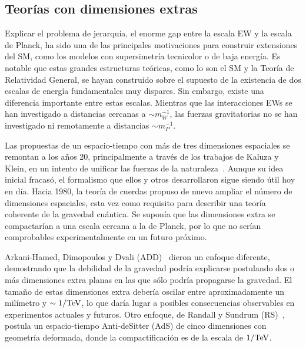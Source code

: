 \subsection{Teor\'ias con dimensiones extras}
\label{subsec:theory:bsm:qbh}

Explicar el problema de jerarqu\'ia, el enorme gap entre la escala \ac{EW} y la escala de Planck, ha sido una de las principales motivaciones para construir extensiones del \ac{SM}, como los modelos con supersimetría tecnicolor o de baja energía. Es notable que estas grandes estructuras teóricas, como lo son el \ac{SM} y la Teor\'ia de Relatividad General, se hayan construido sobre el supuesto de la existencia de dos escalas de energía fundamentales muy dispares. Sin embargo, existe una diferencia importante entre estas escalas. Mientras que las interacciones \acp{EW} se han investigado a distancias cercanas a \(\sim m_W^{-1}\), las fuerzas gravitatorias no se han investigado ni remotamente a distancias \(\sim m_P^{-1}\).

Las propuestas de un espacio-tiempo con más de tres dimensiones espaciales se remontan a los años 20, principalmente a través de los trabajos de Kaluza y Klein, en un intento de unificar las fuerzas de la naturaleza~\cite{Bailin_Love-1987}. Aunque su idea inicial fracasó, el formalismo que ellos y otros desarrollaron sigue siendo útil hoy en día. Hacia 1980, la teoría de cuerdas propuso de nuevo ampliar el número de dimensiones espaciales, esta vez como requisito para describir una teoría coherente de la gravedad cuántica. Se suponía que las dimensiones extra se compactarían a una escala cercana a la de Planck, por lo que no serían comprobables experimentalmente en un futuro próximo.

Arkani-Hamed, Dimopoulos y Dvali (ADD)~\cite{ADD-1998} dieron un enfoque diferente, demostrando que la debilidad de la gravedad podría explicarse postulando dos o más dimensiones extra planas en las que sólo podría propagarse la gravedad. El tamaño de estas dimensiones extra debería oscilar entre aproximadamente un milímetro y \(\sim 1/\text{TeV}\), lo que daría lugar a posibles consecuencias observables en experimentos actuales y futuros. Otro enfoque, de Randall y Sundrum (RS)~\cite{RS1-1999_1,RS1-1999_2}, postula un espacio-tiempo Anti-deSitter (AdS) de cinco dimensiones con geometría deformada, donde la compactificación es de la escala de \(1/\text{TeV}\).

